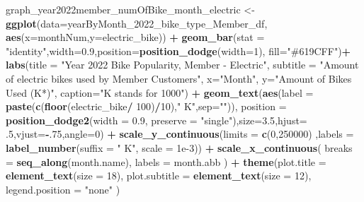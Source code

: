 \documentclass[
]{article}
\newenvironment{Shaded}{\begin{snugshade}}{\end{snugshade}}
\newcommand{\AttributeTok}[1]{\textcolor[rgb]{0.13,0.29,0.53}{#1}}
\newcommand{\DecValTok}[1]{\textcolor[rgb]{0.00,0.00,0.81}{#1}}
\newcommand{\FloatTok}[1]{\textcolor[rgb]{0.00,0.00,0.81}{#1}}
\newcommand{\FunctionTok}[1]{\textcolor[rgb]{0.13,0.29,0.53}{\textbf{#1}}}
\newcommand{\NormalTok}[1]{#1}
\newcommand{\OtherTok}[1]{\textcolor[rgb]{0.56,0.35,0.01}{#1}}
\newcommand{\SpecialCharTok}[1]{\textcolor[rgb]{0.81,0.36,0.00}{\textbf{#1}}}
\newcommand{\StringTok}[1]{\textcolor[rgb]{0.31,0.60,0.02}{#1}}
\begin{document}
\begin{Shaded}
\begin{Highlighting}[]
\NormalTok{graph\_year2022member\_numOfBike\_month\_electric }\OtherTok{\textless{}{-}} \FunctionTok{ggplot}\NormalTok{(}\AttributeTok{data=}\NormalTok{yearByMonth\_2022\_bike\_type\_Member\_df, }\FunctionTok{aes}\NormalTok{(}\AttributeTok{x=}\NormalTok{monthNum,}\AttributeTok{y=}\NormalTok{electric\_bike)) }\SpecialCharTok{+}
  \FunctionTok{geom\_bar}\NormalTok{(}\AttributeTok{stat =} \StringTok{"identity"}\NormalTok{,}\AttributeTok{width=}\FloatTok{0.9}\NormalTok{,}\AttributeTok{position=}\FunctionTok{position\_dodge}\NormalTok{(}\AttributeTok{width=}\DecValTok{1}\NormalTok{), }\AttributeTok{fill=}\StringTok{"\#619CFF"}\NormalTok{)}\SpecialCharTok{+}
  \FunctionTok{labs}\NormalTok{(}\AttributeTok{title =} \StringTok{"Year 2022 Bike Popularity, Member {-} Electric"}\NormalTok{,}
       \AttributeTok{subtitle =} \StringTok{"Amount of electric bikes used by Member Customers"}\NormalTok{,}
       \AttributeTok{x=}\StringTok{"Month"}\NormalTok{,}
       \AttributeTok{y=}\StringTok{"Amount of Bikes Used (K*)"}\NormalTok{,}
       \AttributeTok{caption=}\StringTok{"K stands for 1000"}\NormalTok{) }\SpecialCharTok{+}
  \FunctionTok{geom\_text}\NormalTok{(}\FunctionTok{aes}\NormalTok{(}\AttributeTok{label =} \FunctionTok{paste}\NormalTok{(}\FunctionTok{c}\NormalTok{(}\FunctionTok{floor}\NormalTok{(electric\_bike}\SpecialCharTok{/} \DecValTok{100}\NormalTok{)}\SpecialCharTok{/}\DecValTok{10}\NormalTok{),}\StringTok{" K"}\NormalTok{,}\AttributeTok{sep=}\StringTok{""}\NormalTok{)),}
            \AttributeTok{position =} \FunctionTok{position\_dodge2}\NormalTok{(}\AttributeTok{width =} \FloatTok{0.9}\NormalTok{, }\AttributeTok{preserve =} \StringTok{"single"}\NormalTok{),}\AttributeTok{size=}\FloatTok{3.5}\NormalTok{,}\AttributeTok{hjust=}\NormalTok{ .}\DecValTok{5}\NormalTok{,}\AttributeTok{vjust=}\SpecialCharTok{{-}}\NormalTok{.}\DecValTok{75}\NormalTok{,}\AttributeTok{angle=}\DecValTok{0}\NormalTok{) }\SpecialCharTok{+}
  \FunctionTok{scale\_y\_continuous}\NormalTok{(}\AttributeTok{limits =} \FunctionTok{c}\NormalTok{(}\DecValTok{0}\NormalTok{,}\DecValTok{250000}\NormalTok{) ,}\AttributeTok{labels =} \FunctionTok{label\_number}\NormalTok{(}\AttributeTok{suffix =} \StringTok{" K"}\NormalTok{, }\AttributeTok{scale =} \FloatTok{1e{-}3}\NormalTok{)) }\SpecialCharTok{+}
  \FunctionTok{scale\_x\_continuous}\NormalTok{(}
    \AttributeTok{breaks =} \FunctionTok{seq\_along}\NormalTok{(month.name), }
    \AttributeTok{labels =}\NormalTok{ month.abb}
\NormalTok{  ) }\SpecialCharTok{+}
  \FunctionTok{theme}\NormalTok{(}\AttributeTok{plot.title =} \FunctionTok{element\_text}\NormalTok{(}\AttributeTok{size =} \DecValTok{18}\NormalTok{),}
        \AttributeTok{plot.subtitle =} \FunctionTok{element\_text}\NormalTok{(}\AttributeTok{size =} \DecValTok{12}\NormalTok{),}
        \AttributeTok{legend.position =} \StringTok{"none"}
\NormalTok{  ) }
\end{Highlighting}
\end{Shaded}
\end{document}
